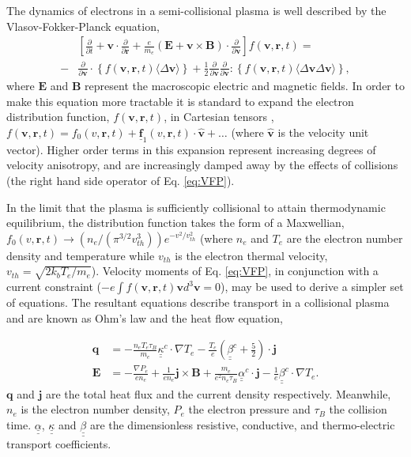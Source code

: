 \documentclass[aip,reprint]{revtex4-1}
\newcommand*{\dbul}[1]{%
	\underline{\underline{ #1}}
}
\newcommand*{\myvec}[1]{
	\mathbf{\underline{#1}}}
\begin{document}
The dynamics of electrons in a semi-collisional plasma is well described by the Vlasov-Fokker-Planck equation,
\begin{eqnarray}
&\left[\frac{\partial}{\partial t}+ \mathbf{v}\cdot \frac{\partial}{\partial \mathbf{r}} + \frac{e}{m_e}\left( \mathbf{E} +  \mathbf{v} \times  \mathbf{B} \right ) \cdot  \frac{\partial}{\partial \mathbf{v}} \right] f( \mathbf{v},\mathbf{r},t) =
\nonumber\\ 
-  &\frac{\partial}{\partial \mathbf{v}} \cdot \left\{ f( \mathbf{v},\mathbf{r},t) \langle \Delta \mathbf{v} \rangle \right\} + \frac{1}{2} \frac{\partial}{\partial \mathbf{v}} \frac{\partial}{\partial \mathbf{v}}:  \left\{ f( \mathbf{v},\mathbf{r},t) \langle \Delta \mathbf{v} \Delta \mathbf{v}\rangle \right\}, \label{eq:VFP}
\end{eqnarray}
where $\mathbf{E}$ and $\mathbf{B}$ represent the macroscopic electric and magnetic fields. In order to make  this equation more tractable it is standard to expand the electron distribution function, $f( \mathbf{v},\mathbf{r},t)$, in Cartesian tensors \cite{Shkarovsky1966}, $f(\mathbf{v},\mathbf{r},t) = f_0(v,\mathbf{r},t) + \myvec{f}_1(v,\mathbf{r},t) \cdot \hat{\mathbf{v}} + \dots$ (where $\hat{\mathbf{v}}$ is the velocity unit vector). Higher order terms in this expansion represent increasing degrees of velocity anisotropy, and are increasingly damped away by the effects of collisions (the right hand side operator of Eq. \ref{eq:VFP}). 


In the limit that the plasma is sufficiently collisional to attain thermodynamic equilibrium,  the distribution function takes the form of a Maxwellian, $f_0(v,\mathbf{r},t) \rightarrow (n_e/(\pi^{3/2} v_{th}^3))e^ {-v^2/v_{th}^2}$ (where $n_e$ and $T_e$ are the electron number density and temperature while $v_{th}$ is the  electron thermal velocity, $v_{th} = \sqrt{2 k_b T_e/m_e}$).  Velocity moments of Eq. \ref{eq:VFP}, in conjunction with a current constraint ($-e\int f(\mathbf{v},\mathbf{r},t) \mathbf{v} d^3 \mathbf{v} = 0$), may be used to derive a simpler set of equations. The resultant equations describe transport in a collisional plasma and are known as Ohm's law and the  heat flow equation,

\begin{eqnarray}
\mathbf{q} &= - \frac{n_e T_e \tau_B}{m_e}\dbul{\kappa}^c \cdot \nabla T_e - \frac{T_e}{e}\left(\dbul{\beta}^c + \frac{5}{2}\right) \cdot \mathbf{j} \\
 \mathbf{E} &= -\frac{\nabla P_e}{e n_e} + \frac{1}{en_e}\mathbf{j}\times \mathbf{B} + \frac{m_e}{e^2 n_e \tau_B}\dbul{\alpha}^c \cdot \mathbf{j} - \frac{1}{e} \dbul{\beta}^{c} \cdot \nabla T_e.
   \label{eq:transport}
\end{eqnarray}
$\mathbf{q}$ and $\mathbf{j}$ are the total heat flux  and the current density respectively. Meanwhile, $n_e$ is the electron number density, $P_e$ the electron pressure and $\tau_B$ the collision time. $\dbul{\alpha}$, $\dbul{\kappa}$ and $\dbul{\beta}$ are the dimensionless resistive, conductive, and thermo-electric transport coefficients\cite{Epperlein1986}.
\end{document}
